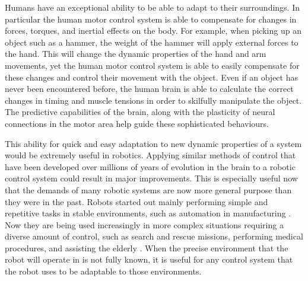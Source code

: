 \documentclass[letterpaper,12pt,titlepage,oneside,final]{book}
\begin{document}
Humans have an exceptional ability to be able to adapt to their surroundings.
In particular the human motor control system is able to compensate for changes in forces, torques, and inertial effects on the body.
For example, when picking up an object such as a hammer, the weight of the hammer will apply external forces to the hand.
This will change the dynamic properties of the hand and arm movements, yet the human motor control system is able to easily compensate for these changes and control their movement with the object.
Even if an object has never been encountered before, the human brain is able to calculate the correct changes in timing and muscle tensions in order to skilfully manipulate the object. %
The predictive capabilities of the brain, along with the plasticity of neural connections in the motor area help guide these sophisticated behaviours.

This ability for quick and easy adaptation to new dynamic properties of a system would be extremely useful in robotics. 
Applying similar methods of control that have been developed over millions of years of evolution in the brain to a robotic control system could result in major improvements. 
This is especially useful now that the demands of many robotic systems are now more general purpose than they were in the past. 
Robots started out mainly performing simple and repetitive tasks in stable environments, such as automation in manufacturing \cite{garcia2007evolution}. 
Now they are being used increasingly in more complex situations requiring a diverse amount of control, such as search and rescue missions, performing medical procedures, and assisting the elderly \cite{garcia2007evolution, hockstein2007history, nourbakhsh2005human, lacey1998application}. 
When the precise environment that the robot will operate in is not fully known, it is useful for any control system that the robot uses to be adaptable to those environments.
\end{document}
